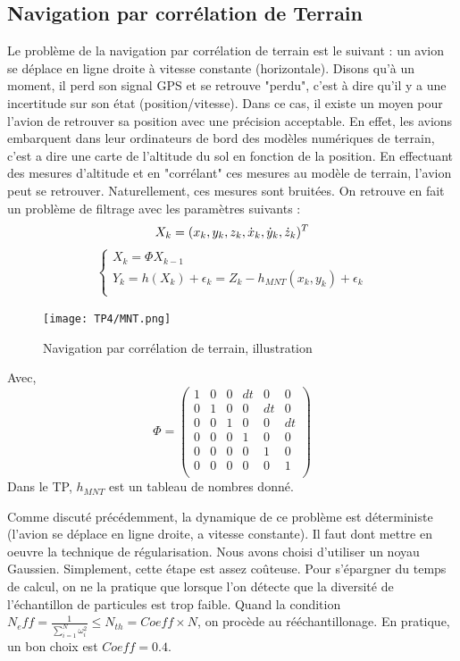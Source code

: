 \documentclass{article}
\begin{document}
\subsection{Navigation par corrélation de Terrain}
Le problème de la navigation par corrélation de terrain est le suivant : 
un avion se déplace en ligne droite à vitesse constante (horizontale). Disons qu'à un moment,
il perd son signal GPS et se retrouve "perdu", c'est à dire qu'il y a une incertitude sur son état (position/vitesse). Dans ce cas, il 
existe un moyen pour l'avion de retrouver sa position avec une précision acceptable. En effet, les avions embarquent dans leur ordinateurs de bord
des modèles numériques de terrain, c'est a dire une carte de l'altitude du sol en fonction de la position. En effectuant des mesures d'altitude et en "corrélant" ces 
mesures au modèle de terrain, l'avion peut se retrouver. Naturellement, ces mesures sont bruitées. On retrouve en fait un problème de filtrage avec les paramètres suivants :
\begin{equation*}
   X_k = (x_k,y_k,z_k,\Dot{x}_k,\Dot{y}_k,\Dot{z}_k)^T\\
\end{equation*}
\begin{equation*}
   \left\{\begin{array}{c}
      X_k = \Phi X_{k-1} \\
      Y_k=h(X_k)+\epsilon_k = Z_k -h_{MNT}(x_k,y_k)+\epsilon_k \\
   \end{array}\right.
\end{equation*}
\begin{figure}[h!]
   \centering
   \label{MNT}
   \caption{Navigation par corrélation de terrain, illustration}
   \texttt{[image: TP4/MNT.png]}
\end{figure}
Avec,
\[\Phi = \begin{pmatrix}
            1&0&0&dt&0&0\\
            0&1&0&0&dt&0\\
            0&0&1&0&0&dt\\
            0&0&0&1&0&0\\
            0&0&0&0&1&0\\
            0&0&0&0&0&1\\
         \end{pmatrix}
\]
Dans le TP, $h_{MNT}$ est un tableau de nombres donné.

Comme discuté précédemment, la dynamique de ce problème est déterministe (l'avion se déplace en ligne droite, a vitesse constante). 
Il faut dont mettre en oeuvre la technique de régularisation. Nous avons choisi d'utiliser un noyau Gaussien.
Simplement, cette étape est assez coûteuse. Pour s'épargner du temps de calcul, on 
ne la pratique que lorsque l'on détecte que la diversité de l'échantillon de particules est 
trop faible. Quand la condition $N_eff = \frac{1}{\sum_{i=1}^{N}\omega_i^2} \leq N_{th}=Coeff \times N$, on procède au rééchantillonage.
En pratique, un bon choix est $Coeff = 0.4$.
\end{document}
